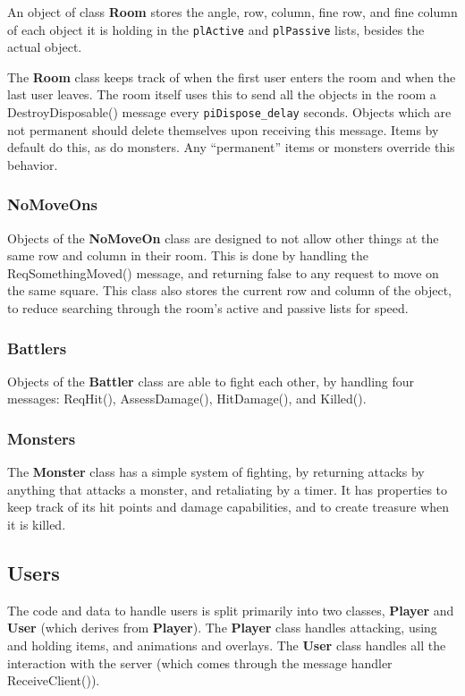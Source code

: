 \documentclass[12pt]{article}
\newcommand{\class}[1]{\textbf{#1}}
\newcommand{\prop}[1]{\texttt{#1}}
\begin{document}
An object of class \class{Room} stores the angle, row, column, fine
row, and fine column of each object it is holding in the
\prop{plActive} and \prop{plPassive} lists, besides the actual object.

The \class{Room} class keeps track of when the first user enters the
room and when the last user leaves.  The room itself uses this to
send all the objects in the room a DestroyDisposable() message every
\prop{piDispose\_delay} seconds.  Objects which are not permanent
should delete themselves upon receiving this message.  Items by
default do this, as do monsters.  Any ``permanent'' items or monsters
override this behavior.

\subsubsection{NoMoveOns}

Objects of the \class{NoMoveOn} class are designed to not allow other
things at the same row and column in their room.  This is done by
handling the ReqSomethingMoved() message, and returning false to any
request to move on the same square.  This class also stores the
current row and column of the object, to reduce searching through the
room's active and passive lists for speed.

\subsubsection{Battlers}

Objects of the \class{Battler} class are able to fight each other, by
handling four messages:  ReqHit(), AssessDamage(), HitDamage(), and
Killed().

\subsubsection{Monsters}

The \class{Monster} class has a simple system of fighting, by
returning attacks by anything that attacks a monster, and retaliating
by a timer.  It has properties to keep track of its hit points and
damage capabilities, and to create treasure when it is killed.

\subsection{Users}
\label{section:users}

The code and data to handle users is split primarily into two classes,
\class{Player} and \class{User} (which derives from \class{Player}).
The \class{Player} class handles attacking, using and holding items,
and animations and overlays.  The \class{User} class handles all the
interaction with the server (which comes through the message handler
ReceiveClient()).
\end{document}

